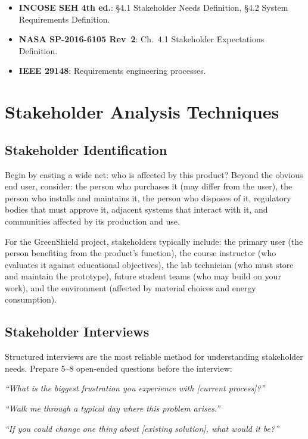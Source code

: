 \begin{keyconceptbox}
\begin{itemize}[nosep,leftmargin=1.5em]
\item \textbf{INCOSE SEH 4th ed.}: \S4.1 Stakeholder Needs Definition, \S4.2 System Requirements Definition.
\item \textbf{NASA SP-2016-6105 Rev~2}: Ch.~4.1 Stakeholder Expectations Definition.
\item \textbf{IEEE 29148}: Requirements engineering processes.
\end{itemize}
\end{keyconceptbox}

\section{Stakeholder Analysis Techniques}
\subsection{Stakeholder Identification}
Begin by casting a wide net: who is affected by this product? Beyond the obvious end user, consider: the person who purchases it (may differ from the user), the person who installs and maintains it, the person who disposes of it, regulatory bodies that must approve it, adjacent systems that interact with it, and communities affected by its production and use.

For the GreenShield project, stakeholders typically include: the primary user (the person benefiting from the product's function), the course instructor (who evaluates it against educational objectives), the lab technician (who must store and maintain the prototype), future student teams (who may build on your work), and the environment (affected by material choices and energy consumption).

\subsection{Stakeholder Interviews}
Structured interviews are the most reliable method for understanding stakeholder needs. Prepare 5--8 open-ended questions before the interview:

\emph{``What is the biggest frustration you experience with [current process]?''}

\emph{``Walk me through a typical day where this problem arises.''}

\emph{``If you could change one thing about [existing solution], what would it be?''}

